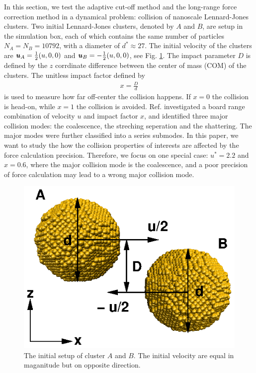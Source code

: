 \documentclass[aps,pre,preprint]{revtex4}
\renewcommand{\v}[1]{\textbf{\textit{#1}}}
\begin{document}
In this section, we test the adaptive cut-off method and the long-range force
correction method in a dynamical problem: collision of nanoscale
Lennard-Jones clusters. Two initial Lennard-Jones clusters, denoted by
$A$ and $B$, are setup in the simulation box, each of which contains
the same number of particles $N_A = N_B = 10792$, with a diameter of
$d^\ast\approx 27$. The initial velocity of the clusters are $\v u_A =
\frac12(u, 0, 0)$ and $\v u_B = -\frac12(u, 0, 0)$, see
Fig. \ref{fig:tmp7}. The impact parameter $D$ is defined by the $z$
corrdinate difference between the center of mass (COM) of the
clusters. The unitless impact factor defined by
\begin{align}
  x = \frac D d
\end{align}
is used to measure how far off-center the collision happens. If $x =
0$ the collision is head-on, while $x=1$ the collision is avoided.
Ref. \cite{kalweit2006collision} investigated a board range
combination of velocity $u$ and impact factor $x$, and identified
three major collision modes: the coalescence, the streching seperation
and the shattering. The major modes were further classified into a
series submodes. In this paper, we want to study the how the collision
properties of interests are affected by the force calculation
precision. Therefore, we focus on one special case: $u^\ast = 2.2$ and
$x = 0.6$, where the major collision mode is the coalescence, and a
poor precision of force calculation may lead to a wrong major
collision mode.

\begin{figure}
  \centering
  \includegraphics[]{fig/collision-init/init.2.eps}
  \caption{The initial setup of cluster $A$ and $B$. The initial
    velocity are equal in maganitude but on opposite direction.}
  \label{fig:tmp7}
\end{figure}
\end{document}
